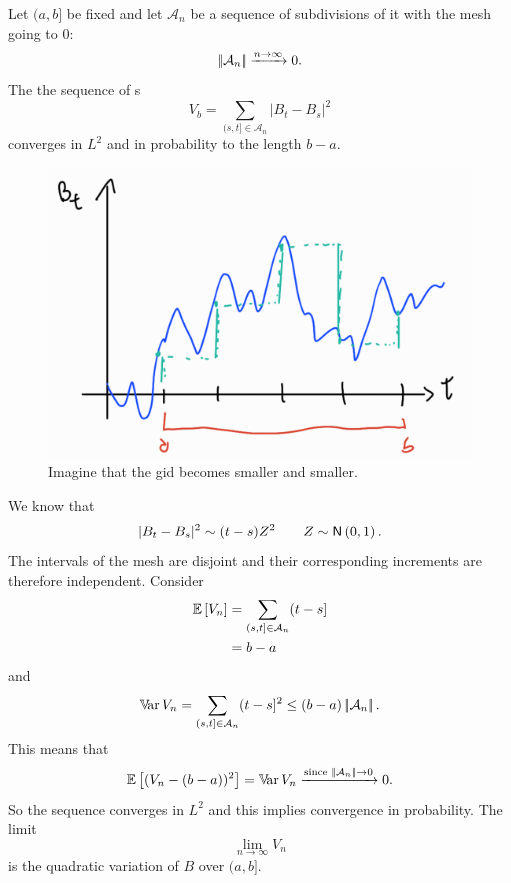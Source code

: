 \documentclass[12pt]{report}
\begin{document}
\begin{theorem}
	Let $(a,b]$ be fixed and let $\mathcal{A}_{n}$ be a sequence of subdivisions of it with the mesh going to 0:
	\begin{equation*}
		\left|\negthinspace\left|\mathcal{A}_{n}\right|\negthinspace\right|\xrightarrow{n\to\infty}0.
	\end{equation*}
	The the sequence of \rv s
	\begin{equation*}
		V_{b}=\sum_{(s,t]\in\mathcal{A}_{n}}|B_{t}-B_{s}|^{2}
	\end{equation*}
	converges in $L^{2}$ and in probability to the length $b-a$.
\end{theorem}
\begin{figure}[H]
	\centering
	\includegraphics[width=0.5\linewidth]{img/screenshot042}
	\caption{Imagine that the gid becomes smaller and smaller.}
	\label{fig:screenshot042}
\end{figure}
\begin{fancyproof}
	We know that 
	\begin{equation*}
		|B_{t}-B_{s}|^{2}\sim(t-s)Z^{2}\qquad Z\sim\mathsf{N}\left(0,1\right).
	\end{equation*}
	The intervals of the mesh are disjoint and their corresponding increments are therefore independent. Consider
	\begin{align*}
		\mathbb{E}\left[V_{n}\right]&=\sum_{(s,t]\in\mathcal{A}_{n}}(t-s]\\ &=b-a
	\end{align*}
	and
	\begin{align*}
		\mathbb{V}\!\mathrm{ar}\, V_{n}=\sum_{(s,t]\in\mathcal{A}_{n}}(t-s]^{2}\leq (b-a)\left|\negthinspace\left|\mathcal{A}_{n}\right|\negthinspace\right|.
	\end{align*}
	This means that 
	\begin{equation*}
		\mathbb{E}\left[(V_{n}-(b-a))^{2}\right]=\mathbb{V}\!\mathrm{ar}\, V_{n}\xrightarrow{\text{since }\left|\negthinspace\left|\mathcal{A}_{n}\right|\negthinspace\right|\to0}0.
	\end{equation*}
	So the sequence converges in $L^{2}$ and this implies convergence in probability. The limit
	\begin{equation*}
		\lim_{n\to\infty} V_{n} 
	\end{equation*} is the quadratic variation of $B$ over $(a,b]$.
\end{fancyproof}
\end{document}
